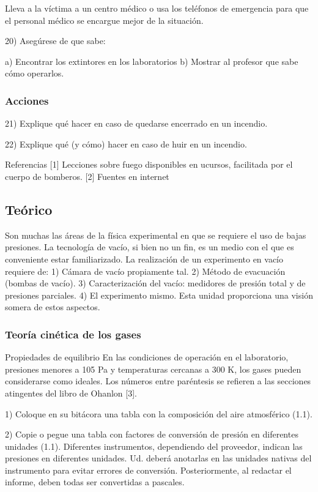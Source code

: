 \documentclass[letterpaper,11pt]{article}
\begin{document}
Lleva a la víctima a un centro médico o usa los teléfonos de emergencia para que el personal médico se encargue mejor de la situación.


20) Asegúrese de que sabe:

a) Encontrar los extintores en los laboratorios
b) Mostrar al profesor que sabe cómo operarlos.

\subsubsection{Acciones} 
21) Explique qué hacer en caso de quedarse encerrado en un incendio.

22) Explique qué (y cómo) hacer en caso de huir en un incendio.

Referencias
[1] Lecciones sobre fuego disponibles en ucursos, facilitada por el cuerpo de bomberos.
[2] Fuentes en internet

\subsection{Teórico}

Son muchas las áreas de la física experimental en que se requiere el uso de bajas presiones.
La tecnología de vacío, si bien no un fin, es un medio con el que es conveniente estar
familiarizado. La realización de un experimento en vacío requiere de:
1) Cámara de vacío propiamente tal.
2) Método de evacuación (bombas de vacío).
3) Caracterización del vacío: medidores de presión total y de presiones parciales.
4) El experimento mismo.
Esta unidad proporciona una visión somera de estos aspectos.

\subsubsection{Teoría cinética de los gases} 

Propiedades de equilibrio
En las condiciones de operación en el laboratorio, presiones menores a 105 Pa y temperaturas cercanas a 300 K, los gases pueden considerarse como ideales. Los números entre paréntesis se refieren a las secciones atingentes del libro de Ohanlon [3].

1) Coloque en su bitácora una tabla con la composición del aire atmosférico (1.1).

2) Copie o pegue una tabla con factores de conversión de presión en diferentes
unidades (1.1). Diferentes instrumentos, dependiendo del proveedor, indican las
presiones en diferentes unidades. Ud. deberá anotarlas en las unidades nativas del
instrumento para evitar errores de conversión. Posteriormente, al redactar el
informe, deben todas ser convertidas a pascales.
\end{document}
